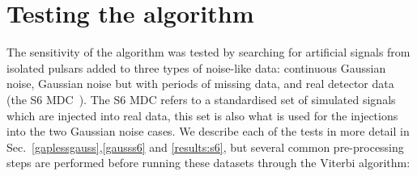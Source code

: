 \section{\label{results} Testing the algorithm}
%
%
The sensitivity of the algorithm was tested by searching for artificial
signals from isolated pulsars added to three types of noise-like data:
continuous Gaussian noise, Gaussian noise but with periods of missing data,
and real detector data (the S6 \ac{MDC}~\citep{walsh2016ComparisonMethods}). The S6 \ac{MDC} refers to a standardised set of simulated signals which are injected into real data, this set is also what is used for the injections into the two Gaussian noise cases. We describe each
of the tests in more detail in Sec.~\ref{gaplessgauss},\ref{gausss6} and
\ref{results:s6}, but several common pre-processing steps are performed
before running these datasets through the Viterbi algorithm:
%
%
